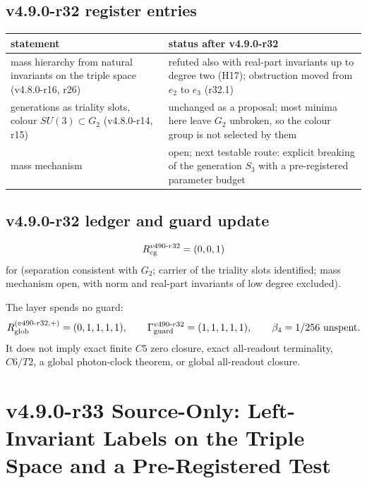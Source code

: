 \subsection*{v4.9.0-r32 register entries}
\label{subsec:v490-r32-register}

\begin{center}
\small
\begin{tabular}{@{}>{\raggedright\arraybackslash}p{}>{\raggedright\arraybackslash}p{}@{}}
\toprule
statement & status after v4.9.0-r32\\
\midrule
mass hierarchy from natural invariants on the triple space (v4.8.0-r16, r26) & refuted also with real-part invariants up to degree two (H17); obstruction moved from \(e_2\) to \(e_3\) (r32.1)\\
generations as triality slots, colour \(SU(3)\subset G_2\) (v4.8.0-r14, r15) & unchanged as a proposal; most minima here leave \(G_2\) unbroken, so the colour group is not selected by them\\
mass mechanism & open; next testable route: explicit breaking of the generation \(S_3\) with a pre-registered parameter budget\\
\bottomrule
\end{tabular}
\end{center}

\subsection*{v4.9.0-r32 ledger and guard update}
\label{subsec:v490-r32-ledger-guard}

\[
R_{\rm cg}^{v490\text{-}r32}=(0,0,1)
\]
for (separation consistent with \(G_2\); carrier of the triality slots identified; mass mechanism open, with norm and
real-part invariants of low degree excluded).

The layer spends no guard:
\[
R_{\rm glob}^{(v490\text{-}r32,+)}=(0,1,1,1,1),
\qquad
\Gamma_{\rm guard}^{v490\text{-}r32}=(1,1,1,1,1),
\qquad
\beta_4=1/256\ \text{unspent}.
\]
It does not imply exact finite \(C5\) zero closure, exact all-readout terminality,
\(C6/T2\), a global photon-clock theorem, or global all-readout closure.

\clearpage
\section*{v4.9.0-r33 Source-Only: Left-Invariant Labels on the Triple Space and a Pre-Registered Test}
\label{sec:v490-r33-left-invariant-labels}

